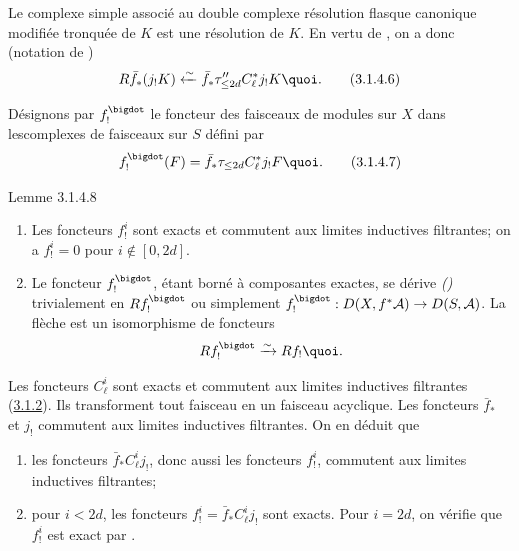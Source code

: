 Le complexe simple associé au double complexe résolution flasque
canonique modifiée tronquée de $K$ est une résolution de $K$. En vertu
de , on a donc (notation de )
\begin{equation*}
R\bar{f}_{\ast}(j_{!}K)\xleftarrow{\sim} \bar{f}_{\ast}\tau''_{\leq
2d} C^{\ast}_{\ell}j_{!}K{\quoi}.\tag{3.1.4.6}
\end{equation*}

Désignons par $f^{\bigdot}_{!}$ le foncteur des faisceaux de modules
sur $X$ dans les\pageoriginale complexes de faisceaux sur $S$ défini
par
\begin{equation*}
f^{\bigdot}_{!}(F)=\bar{f}_{\ast}\tau_{\leq
2d}C^{\ast}_{\ell}j_{!}F{\quoi}.\tag{3.1.4.7}
\end{equation*}

\begin{enonce*}{Lemme 3.1.4.8}
\begin{enumerate}
\renewcommand{\theenumi}{\roman{enumi}}
\renewcommand{\labelenumi}{(\theenumi)}
\item Les foncteurs $f^{i}_{!}$ sont exacts et commutent aux limites
inductives filtrantes; on a $f^{i}_{!}=0$ pour $i\not\in[0,2d]$.

\item Le foncteur $f^{\bigdot}_{!}$, étant borné à composantes
exactes, se dérive \emph{()} trivialement en
$Rf^{\bigdot}_{!}$ ou simplement
$f^{\bigdot}_{!}:D(X,f^{\ast}\mathcal{A})\rightarrow
D(S,\mathcal{A})$. La flèche  est un isomorphisme de
foncteurs
$$
Rf^{\bigdot}_{!}\xrightarrow{\sim} Rf_{!}{\quoi}.
$$
\end{enumerate}
\end{enonce*}

Les foncteurs $C^{i}_{\ell}$ sont exacts et commutent aux limites
inductives filtrantes (\hyperref[XVIII.subsubsec3.1.2]{3.1.2}). Ils transforment
tout faisceau en un faisceau acyclique. Les foncteurs $\bar{f}_{\ast}$
et $j_{!}$ commutent aux limites inductives filtrantes. On en déduit que
\begin{enumerate}
\renewcommand{\theenumi}{\alph{enumi}}
\renewcommand{\labelenumi}{\theenumi)}
\item les foncteurs $\bar{f}_{\ast}C^{i}_{\ell}j_{!}$, donc aussi les
foncteurs $f^{i}_{!}$, commutent aux limites inductives filtrantes;

\item pour $i<2d$, les foncteurs
$f^{i}_{!}=\bar{f}_{\ast}C^{i}_{\ell}j_{!}$ sont exacts. Pour $i=2d$,
on vérifie que $f^{i}_{!}$ est exact par .
\end{enumerate}

